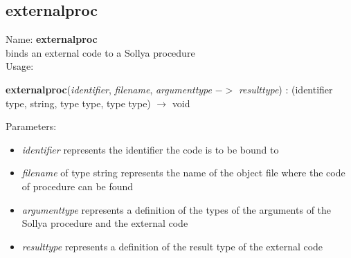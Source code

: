 \subsection{externalproc}
\label{labexternalproc}
\noindent Name: \textbf{externalproc}\\
binds an external code to a Sollya procedure\\

\noindent Usage: 
\begin{center}
\textbf{externalproc}(\emph{identifier}, \emph{filename}, \emph{argumenttype} $->$ \emph{resulttype}) : (\textsf{identifier type}, \textsf{string}, \textsf{type type}, \textsf{type type}) $\rightarrow$ \textsf{void}\\
\end{center}
Parameters: 
\begin{itemize}
\item \emph{identifier} represents the identifier the code is to be bound to
\item \emph{filename} of type \textsf{string} represents the name of the object file where the code of procedure can be found
\item \emph{argumenttype} represents a definition of the types of the arguments of the Sollya procedure and the external code
\item \emph{resulttype} represents a definition of the result type of the external code
\end{itemize}
